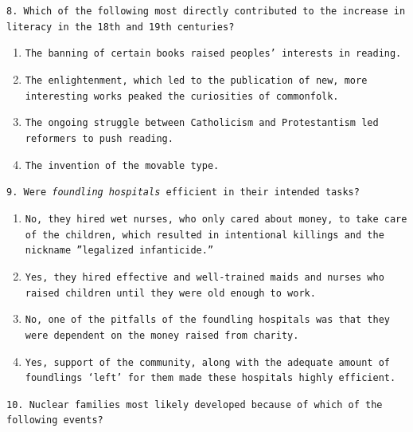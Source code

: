 \documentclass[11pt]{scrartcl} %
\begin{document}

\newpage


\texttt{8. Which of the following most directly contributed to the increase in literacy in the 18th and 19th centuries?}

\begin{enumerate}[label=\texttt{\textbf{\alph*)}}]
\item \texttt{The banning of certain books raised peoples' interests in reading.}
\item \texttt{The enlightenment, which led to the publication of new, more interesting works peaked the curiosities of commonfolk.}
\item \texttt{The ongoing struggle between Catholicism and Protestantism led reformers to push reading.}
\item \texttt{The invention of the movable type.}
\end{enumerate}


\texttt{9. Were \textit{foundling hospitals} efficient in their intended tasks?}

\begin{enumerate}[label=\texttt{\textbf{\alph*)}}]
\item \texttt{No, they hired wet nurses, who only cared about money, to take care of the children, which resulted in intentional killings and the nickname ''legalized infanticide.''}
\item \texttt{Yes, they hired effective and well-trained maids and nurses who raised children until they were old enough to work.}
\item \texttt{No, one of the pitfalls of the foundling hospitals was that they were dependent on the money raised from charity.}
\item \texttt{Yes, support of the community, along with the adequate amount of foundlings `left' for them made these hospitals highly efficient.}
\end{enumerate}


\texttt{10. Nuclear families most likely developed because of which of the following events?}
\end{document}

